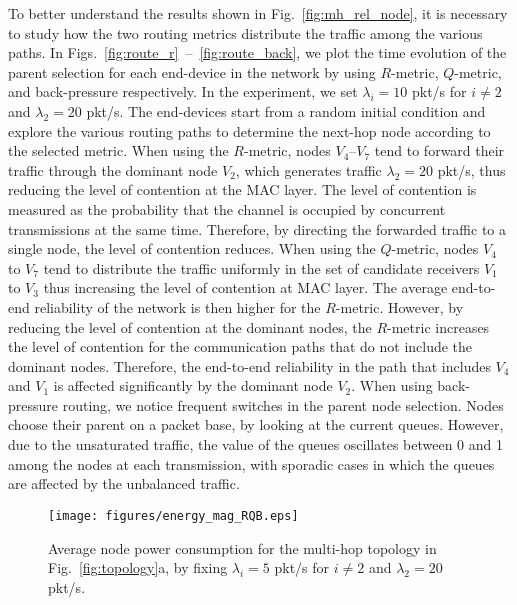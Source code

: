 \documentclass[review, 1p, 11pt]{elsarticle}
\numberwithin{equation}{section}
\begin{document}
To better  understand the results shown in Fig.~\ref{fig:mh_rel_node}, it is necessary to study how the two routing metrics distribute the traffic among the various paths.
In Figs.~\ref{fig:route_r}~--~\ref{fig:route_back}, we plot the time evolution of the parent selection for each end-device in the network by using $R$-metric, $Q$-metric, and back-pressure respectively. In the experiment, we set $\lambda_i=10$ pkt/s for $i\neq2$ and $\lambda_2=20$ pkt/s. The end-devices start from a random initial condition and explore the various routing paths to determine the next-hop node according to the selected metric. When using the $R$-metric, nodes $V_4$--$V_7$ tend to forward their traffic through the dominant node
$V_2$, which generates traffic $\lambda_2=20$ pkt/s, thus reducing the level of contention at the MAC layer.
The level of contention is measured as the probability that the channel is occupied by concurrent transmissions at the same time.
Therefore, by directing the forwarded traffic to a single node, the level of contention reduces.
When using the $Q$-metric,  nodes $V_4$ to $V_7$ tend to distribute the traffic uniformly in the set of candidate receivers $V_1$ to $V_3$ thus increasing the level of contention at MAC layer. The average end-to-end reliability of the network is then higher for the $R$-metric. However, by reducing the level of contention at the dominant nodes, the $R$-metric increases the level of contention for the communication paths that do not include the dominant nodes. Therefore, the end-to-end reliability in the path that includes $V_4$ and $V_1$ is affected significantly by the dominant node $V_2$.
When using back-pressure routing, we notice frequent switches in the parent node selection. Nodes choose their parent on a packet base, by looking at the current queues. However, due to the unsaturated traffic, the value of the queues oscillates between 0 and 1 among the nodes at each transmission, with sporadic cases in which the queues are affected by the unbalanced traffic.









\begin{figure}[h] \centering
\texttt{[image: figures/energy\_mag\_RQB.eps]}
\caption{Average node power consumption for the multi-hop
topology in Fig.~\ref{fig:topology}a, by fixing $\lambda_i=5$ pkt/s for $i\neq2$ and $\lambda_2=20$ pkt/s.\label{fig:mh_ene_node}}
\end{figure}
\end{document}
